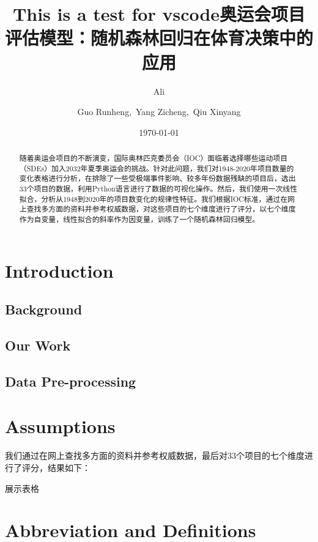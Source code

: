 \documentclass[a4paper]{article}
\title{ This is a test for vscode}
\author{ Ali}
\title{奥运会项目评估模型：随机森林回归在体育决策中的应用}
\author{ Guo Runheng,\ Yang Zicheng,\ Qiu Xinyang}
\date{\today}
\begin{document}
    \maketitle


\begin{abstract}
    随着奥运会项目的不断演变，国际奥林匹克委员会（IOC）面临着选择哪些运动项目（SDEs）加入2032年夏季奥运会的挑战。针对此问题，我们对1948-2020年项目数量的变化表格进行分析，在排除了一些受极端事件影响、较多年份数据残缺的项目后，选出33个项目的数据，利用Python语言进行了数据的可视化操作。然后，我们使用一次线性拟合，分析从1948到2020年的项目数变化的规律性特征。我们根据IOC标准，通过在网上查找多方面的资料并参考权威数据，对这些项目的七个维度进行了评分，以七个维度作为自变量，线性拟合的斜率作为因变量，训练了一个随机森林回归模型。
\end{abstract}
\tableofcontents
\section{Introduction}
\subsection{Background}     
\subsection{Our Work}
\subsection{Data Pre-processing}


\section{Assumptions}
我们通过在网上查找多方面的资料并参考权威数据，最后对33个项目的七个维度进行了评分，结果如下：

展示表格

\section{Abbreviation and Definitions}
\end{document}
